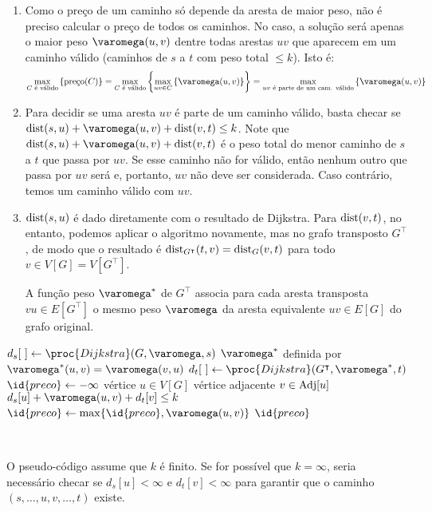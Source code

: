 \begin{enumerate}
    \item Como o preço de um caminho só depende da aresta de maior peso, não é preciso calcular o preço de todos os caminhos. No caso, a solução será apenas o maior peso $\varomega(u, v)$ dentre todas arestas $u v$ que aparecem em um caminho válido (caminhos de $s$ a $t$ com peso total $\leq k$). Isto é:
    \[
        \max_{C\text{ é válido}}\set{\text{preço}(C)}
        = \max_{C\text{ é válido}} \set{\max_{u v \in C}\set{\varomega(u, v)}}
        = \max_{u v\text{ é parte de um cam. válido}} \set{\varomega(u, v)}
    \]

    \item Para decidir se uma aresta $u v$ é parte de um caminho válido, basta checar se \\ $\dist(s, u) + \varomega(u, v) + \dist(v, t) \leq k$. Note que $\dist(s, u) + \varomega(u, v) + \dist(v, t)$ é o peso total do menor caminho de $s$ a $t$ que passa por $u v$. Se esse caminho não for válido, então nenhum outro que passa por $u v$ será e, portanto, $u v$ não deve ser considerada. Caso contrário, temos um caminho válido com $u v$.

    \item $\operatorname{dist}(s, u)$ é dado diretamente com o resultado de Dijkstra. Para $\operatorname{dist}(v, t)$, no entanto, podemos aplicar o algoritmo novamente, mas no grafo transposto $G^\intercal$, de modo que o resultado é $\operatorname{dist}_{G^\intercal}(t, v) = \operatorname{dist}_{G}(v, t)$ para todo $v \in V[G] = V[G^\intercal]$.

    A função peso $\varomega^*$ de $G^\intercal$ associa para cada aresta transposta $v u \in E[G^\intercal]$ o mesmo peso $\varomega$ da aresta equivalente $u v \in E[G]$ do grafo original.
\end{enumerate}

\begin{codebox}

    \li $d_s[~] \Recebe \proc{Dijkstra}(G, \varomega, s)$
    \li \Seja $\varomega^*$ definida por $\varomega^*(u, v) = \varomega(v, u)$
    \li $d_t[~] \Recebe \proc{Dijkstra}(G^\intercal, \varomega^*, t)$
    \li
    \li $\id{preco} \Recebe -\infty$
    \li \Para \Cada vértice $u \in V[G]$ \Faca
        \Do
    \li     \Para \Cada vértice adjacente $v \in \operatorname{Adj}[u]$ \Faca
            \Do
    \li         \Se $d_s[u] + \varomega(u, v) + d_t[v] \leq k$
                \Do
    \li             \Entao $\id{preco} \Recebe \max\{\id{preco}, \varomega(u, v)\}$
                \End
            \End
        \End
    \li \Devolva $\id{preco}$
\end{codebox}

~

O pseudo-código assume que $k$ é finito. Se for possível que $k = \infty$, seria necessário checar se $d_s[u] < \infty$ e $d_t[v] < \infty$ para garantir que o caminho $(s, \ldots, u, v, \ldots, t)$ existe.
